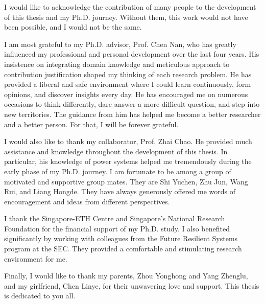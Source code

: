 \begin{acknowledgments}

I would like to acknowledge the contribution of many people to the development of this thesis and my Ph.D. journey. Without them, this work would not have been possible, and I would not be the same. 

I am most grateful to my Ph.D. advisor, Prof. Chen Nan, who has greatly influenced my professional and personal development over the last four years. His insistence on integrating domain knowledge and meticulous approach to contribution justification shaped my thinking of each research problem. He has provided a liberal and safe environment where I could learn continuously, form opinions, and discover insights every day. He has encouraged me on numerous occasions to think differently, dare answer a more difficult question, and step into new territories. The guidance from him has helped me become a better researcher and a better person. For that, I will be forever grateful.  

I would also like to thank my collaborator, Prof. Zhai Chao. He provided much assistance and knowledge throughout the development of this thesis. In particular, his knowledge of power systems helped me tremendously during the early phase of my Ph.D. journey. I am fortunate to be among a group of motivated and supportive group mates. They are Shi Yuchen, Zhu Jun, Wang Rui, and Liang Hongde. They have always generously offered me words of encouragement and ideas from different perspectives. 

I thank the Singapore-ETH Centre and Singapore's National Research Foundation for the financial support of my Ph.D. study. I also benefited significantly by working with colleagues from the Future Resilient Systems program at the SEC. They provided a comfortable and stimulating research environment for me. 

Finally, I would like to thank my parents, Zhou Yonghong and Yang Zhenglu, and my girlfriend, Chen Linye, for their unwavering love and support. This thesis is dedicated to you all. 


\end{acknowledgments}
